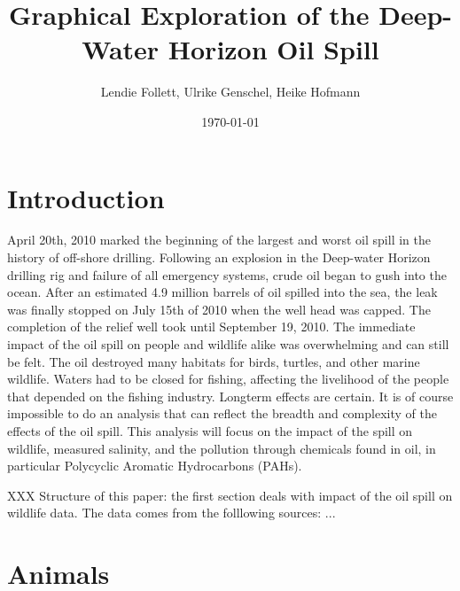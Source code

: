 \documentclass[11pt]{article}
\title{Graphical Exploration of the Deep-Water Horizon Oil Spill}
\author{Lendie Follett, Ulrike Genschel, Heike Hofmann}
\date{\today}                                           %
\begin{document}
\maketitle
\begin{abstract}
\end{abstract}
\section{Introduction}
April 20th, 2010 marked the beginning of the largest and worst oil spill in the history of off-shore drilling.  Following an explosion in the Deep-water Horizon drilling rig and failure of all emergency systems, crude oil began to gush into the ocean.  After an estimated 4.9 million barrels of oil spilled into the sea, the leak was finally stopped on July 15th of 2010 when the well head was capped.  The completion of the relief well took until September 19, 2010.  The immediate impact of the oil spill on people and wildlife alike was overwhelming and can still be felt.  The oil destroyed many habitats for birds, turtles, and other marine wildlife.  Waters had to be closed for fishing, affecting the livelihood of the people that depended on the fishing industry.  Longterm effects are certain.  It is of course impossible to do an analysis that can reflect the breadth and complexity of the effects of the oil spill.  This analysis will focus on the impact of the spill on wildlife, measured salinity, and the pollution through chemicals found in oil, in particular Polycyclic Aromatic Hydrocarbons (PAHs). 

XXX Structure of this paper: the first section deals with impact of the oil spill on wildlife data. The data comes from the folllowing sources: ...
\section{Animals}
\end{document}
